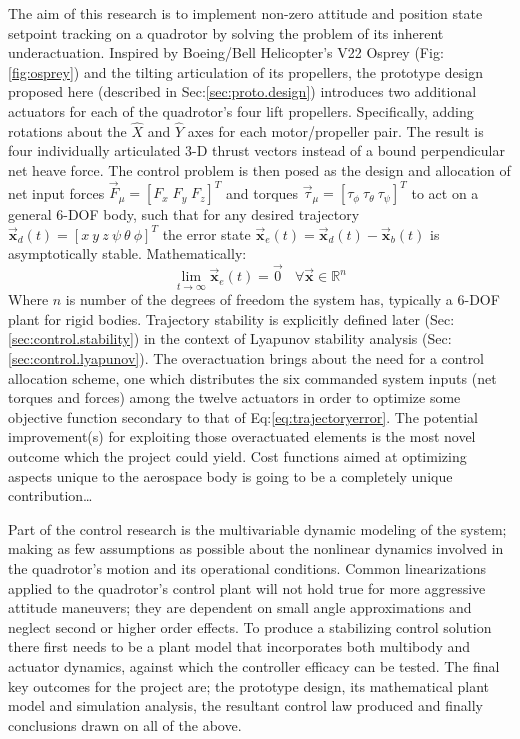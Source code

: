 The aim of this research is to implement non-zero attitude and position state setpoint tracking on a quadrotor by solving the problem of its inherent underactuation. Inspired by Boeing/Bell Helicopter's V22 Osprey (Fig:\ref{fig:osprey}) and the tilting articulation of its propellers, the prototype design proposed here (described in Sec:\ref{sec:proto.design}) introduces two additional actuators for each of the quadrotor's four lift propellers. Specifically, adding rotations about the $\hat{X}$ and $\hat{Y}$ axes for each motor/propeller pair. The result is four individually articulated 3-D thrust vectors instead of a bound perpendicular net heave force. The control problem is then posed as the design and allocation of net input forces $\vec{F}_{\mu} = [F_x\;F_y\;F_z]^T$ and torques $\vec{\tau}_{\mu} = [\tau_{\phi}~\tau_{\theta}~\tau_{\psi}]^T$ to act on a general 6-DOF body, such that for any desired trajectory $\vec{\mathbf{x}}_d(t)=[x~y~z~\psi~\theta~\phi]^T$ the error state $\vec{\mathbf{x}}_e(t) = \vec{\mathbf{x}}_d(t) - \vec{\mathbf{x}}_b(t)$ is asymptotically stable. Mathematically:
\begin{equation} \label{eq:trajectoryerror}
\lim_{t \rightarrow \infty} \vec{\mathbf{x}}_e(t) = \vec{0}~~~~\forall \vec{\mathbf{x}} \in \mathbb{R}^n
\end{equation}
Where $n$ is number of the degrees of freedom the system has, typically a 6-DOF plant for rigid bodies. Trajectory stability is explicitly defined later (Sec:\ref{sec:control.stability}) in the context of Lyapunov stability analysis (Sec:\ref{sec:control.lyapunov}). The overactuation brings about the need for a control allocation scheme, one which distributes the six commanded system inputs (net torques and forces) among the twelve actuators in order to optimize some objective function secondary to that of Eq:\ref{eq:trajectoryerror}. The potential improvement(s) for exploiting those overactuated elements is the most novel outcome which the project could yield. Cost functions aimed at optimizing aspects unique to the aerospace body is going to be a completely unique contribution\ldots
\par
Part of the control research is the multivariable dynamic modeling of the system; making as few assumptions as possible about the nonlinear dynamics involved in the quadrotor's motion and its operational conditions. Common linearizations applied to the quadrotor's control plant will not hold true for more aggressive attitude maneuvers; they are dependent on small angle approximations and neglect second or higher order effects. To produce a stabilizing control solution there first needs to be a plant model that incorporates both multibody and actuator dynamics, against which the controller efficacy can be tested. The final key outcomes for the project are; the prototype design, its mathematical plant model and simulation analysis, the resultant control law produced and finally conclusions drawn on all of the above.
